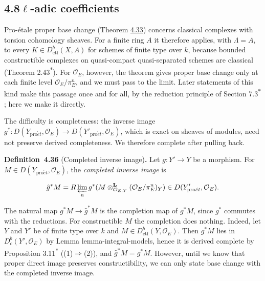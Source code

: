 \documentclass[11pt]{article}
\newenvironment{bpstatement}[2]{\par\addvspace{0.6\baselineskip}\noindent\textbf{#1}#2\textbf{.}\enspace\ignorespaces}
  {\par\addvspace{0.4\baselineskip}}
\newcommand{\bpout}[1]{#1\textsuperscript{\hyperlink{bp-outside}{\ensuremath{\ast}}}}
\providecommand{\Dbc}{}\renewcommand{\Dbc}{D^b_c}
\begin{document}
\subsection*{\texorpdfstring{4.8\quad $\ell$-adic coefficients}{4.8 ell-adic coefficients}}
\label{bp108}%
\label{bp109}%
Pro-étale proper base change (Theorem \hyperref[bp98]{4.33}) concerns classical complexes with torsion cohomology sheaves. For a finite ring \(A\) it therefore applies, with \(\Lambda=A\), to every \(K\in D^b_{\mathrm{ctf}}(X,A)\) for schemes of finite type over \(k\), because bounded constructible complexes on quasi-compact quasi-separated schemes are classical (Theorem \bpout{2.43}). For \(\mathcal O_E\), however, the theorem gives proper base change only at each finite level \(\mathcal O_E/\pi_E^n\), and we must pass to the limit. Later statements of this kind make this passage once and for all, by the reduction principle of Section \bpout{7.3}; here we make it directly.

The difficulty is completeness: the inverse image \(g^*:D(Y_{\mathrm{pro}\acute{e}t},\mathcal O_E)\to D(Y'_{\mathrm{pro}\acute{e}t},\mathcal O_E)\), which is exact on sheaves of modules, need not preserve derived completeness. We therefore complete after pulling back.

\label{bp110}%
\begin{bpstatement}{Definition~4.36}{ (Completed inverse image)}
Let \(g:Y'\to Y\) be a morphism. For \(M\in D(Y_{\mathrm{pro}\acute{e}t},\mathcal O_E)\), the \emph{completed inverse image} is

\[
\hat g^*M
=R\varprojlim_n g^*(M\otimes^{\mathbf L}_{\mathcal O_{E,Y}}
(\mathcal O_E/\pi_E^n)_Y)
\in D(Y'_{\mathrm{pro}\acute{e}t},\mathcal O_E).
\]
\end{bpstatement}

\label{bp111}%
The natural map \(g^*M\to\hat g^*M\) is the completion map of \(g^*M\), since \(g^*\) commutes with the reductions. For constructible \(M\) the completion does nothing. Indeed, let \(Y\) and \(Y'\) be of finite type over \(k\) and \(M\in D^b_{\mathrm{ctf}}(Y,\mathcal O_E)\). Then \(g^*M\) lies in \(\Dbc(Y',\mathcal O_E)\) by Lemma lemma-integral-models, hence it is derived complete by Proposition \bpout{3.11} ((1)\(\Rightarrow\)(2)), and \(\hat g^*M=g^*M\). However, until we know that proper direct image preserves constructibility, we can only state base change with the completed inverse image.
\end{document}

